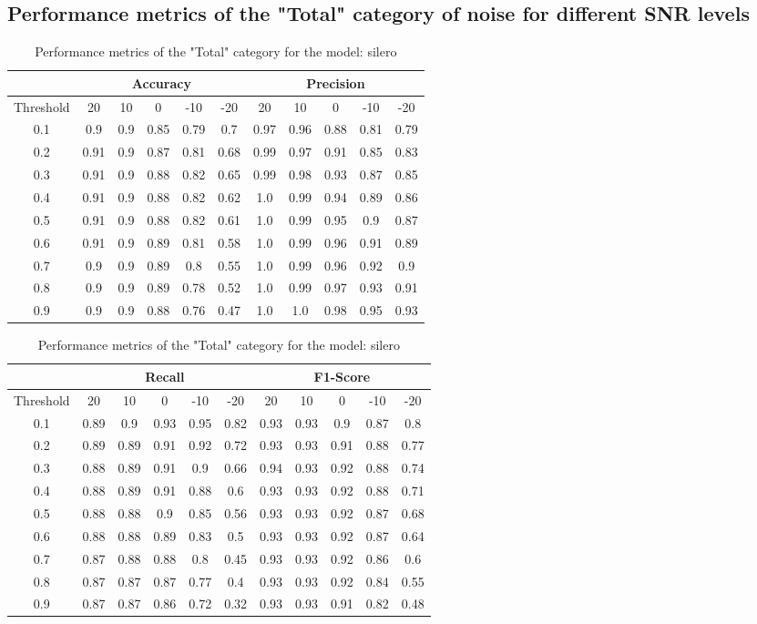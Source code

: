 \documentclass[../main.tex]{subfiles}
\begin{document}
\subsection{Performance metrics of the "Total" category of noise for different SNR levels}

\begin{table}[H]
\centering
\small
\begin{tabular}{ |c|c|c|c|c|c|c|c|c|c|c| }
\hline
    & \multicolumn{5}{|c|}{Accuracy} & \multicolumn{5}{|c|}{Precision} \\ 
\hline
Threshold & 20 & 10 & 0 & -10 & -20 & 20 & 10 & 0 & -10 & -20 \\ 
\hline
0.1& 0.9& 0.9& 0.85& 0.79& 0.7& 0.97& 0.96& 0.88& 0.81& 0.79 \\ 
0.2& 0.91& 0.9& 0.87& 0.81& 0.68& 0.99& 0.97& 0.91& 0.85& 0.83 \\ 
0.3& 0.91& 0.9& 0.88& 0.82& 0.65& 0.99& 0.98& 0.93& 0.87& 0.85 \\ 
0.4& 0.91& 0.9& 0.88& 0.82& 0.62& 1.0& 0.99& 0.94& 0.89& 0.86 \\ 
0.5& 0.91& 0.9& 0.88& 0.82& 0.61& 1.0& 0.99& 0.95& 0.9& 0.87 \\ 
0.6& 0.91& 0.9& 0.89& 0.81& 0.58& 1.0& 0.99& 0.96& 0.91& 0.89 \\ 
0.7& 0.9& 0.9& 0.89& 0.8& 0.55& 1.0& 0.99& 0.96& 0.92& 0.9 \\ 
0.8& 0.9& 0.9& 0.89& 0.78& 0.52& 1.0& 0.99& 0.97& 0.93& 0.91 \\ 
0.9& 0.9& 0.9& 0.88& 0.76& 0.47& 1.0& 1.0& 0.98& 0.95& 0.93 \\ 
\hline
\end{tabular}
\begin{tabular}{ |c|c|c|c|c|c|c|c|c|c|c| }
\hline
    & \multicolumn{5}{|c|}{Recall} & \multicolumn{5}{|c|}{F1-Score} \\ 
\hline
Threshold & 20 & 10 & 0 & -10 & -20 & 20 & 10 & 0 & -10 & -20 \\ 
\hline
0.1& 0.89& 0.9& 0.93& 0.95& 0.82& 0.93& 0.93& 0.9& 0.87& 0.8 \\ 
0.2& 0.89& 0.89& 0.91& 0.92& 0.72& 0.93& 0.93& 0.91& 0.88& 0.77 \\ 
0.3& 0.88& 0.89& 0.91& 0.9& 0.66& 0.94& 0.93& 0.92& 0.88& 0.74 \\ 
0.4& 0.88& 0.89& 0.91& 0.88& 0.6& 0.93& 0.93& 0.92& 0.88& 0.71 \\ 
0.5& 0.88& 0.88& 0.9& 0.85& 0.56& 0.93& 0.93& 0.92& 0.87& 0.68 \\ 
0.6& 0.88& 0.88& 0.89& 0.83& 0.5& 0.93& 0.93& 0.92& 0.87& 0.64 \\ 
0.7& 0.87& 0.88& 0.88& 0.8& 0.45& 0.93& 0.93& 0.92& 0.86& 0.6 \\ 
0.8& 0.87& 0.87& 0.87& 0.77& 0.4& 0.93& 0.93& 0.92& 0.84& 0.55 \\ 
0.9& 0.87& 0.87& 0.86& 0.72& 0.32& 0.93& 0.93& 0.91& 0.82& 0.48 \\ 
\hline
\end{tabular}
\caption{Performance metrics of the "Total" category for the model: silero} 
\end{table}
\end{document}
